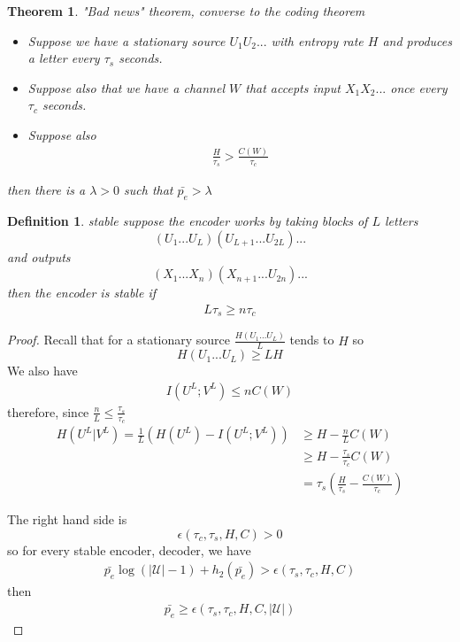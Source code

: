 \documentclass[twoside]{article}
\newtheorem{theorem}{Theorem}[section]
\newtheorem{definition}{Definition}[section]
\theoremstyle{definition} %
\def\U{\mathcal{U}}
\begin{document}
\begin{theorem}{"Bad news" theorem, converse to the coding theorem}
  \begin{itemize}
    \item Suppose we have a stationary source $U_1 U_2 ...$ with entropy rate $H$ and produces a letter every $\tau_s$ seconds.
    \item Suppose also that we have a channel $W$ that accepts input $X_1 X_2 ...$ once every $\tau_c$ seconds.
    \item Suppose also
    \begin{align*}
      \frac{H}{\tau_s} > \frac{C(W)}{\tau_c}
    \end{align*}
  \end{itemize}
  then there is a $\lambda > 0$ such that $\bar{p_e} > \lambda$
\end{theorem}

\begin{definition}{stable}
  suppose the encoder works by taking blocks of $L$ letters
  $$(U_1 ... U_L)(U_{L+1} ... U_{2L})...$$
  and outputs
  $$(X_1 ... X_n)(X_{n+1} ... U_{2n})...$$
  then the encoder is stable if
  \begin{align*}
    L \tau_s \geq n \tau_c
  \end{align*}
\end{definition}

\begin{proof}
  Recall that for a stationary source $\frac{H(U_1 ... U_L)}{L}$ tends to $H$ so
  $$ H(U_1 ... U_L) \geq L H$$
  We also have
  \begin{align*}
    I(U^L; V^L) \leq n C(W)
  \end{align*}
  therefore, since $\frac{n}{L} \leq \frac{\tau_s}{\tau_c}$
  \begin{align*}
    H(U^L | V^L) = \frac{1}{L} (H(U^L) - I(U^L; V^L)) &\geq H - \frac{n}{L} C(W) \\
    &\geq H - \frac{\tau_s}{\tau_c} C(W) \\
    &= \tau_s (\frac{H}{\tau_s} - \frac{C(W)}{\tau_c})
  \end{align*}

  The right hand side is
  $$\epsilon(\tau_c, \tau_s, H, C) > 0$$
  so for every stable encoder, decoder, we have
  \begin{align*}
    \bar{p_e} \log(|\U| - 1) + h_2(\bar{p_e}) > \epsilon(\tau_s, \tau_c, H, C)
  \end{align*}
  then
  \begin{align*}
    \bar{p_e} \geq \epsilon(\tau_s, \tau_c, H, C, |\U|)
  \end{align*}
\end{proof}
\end{document}
